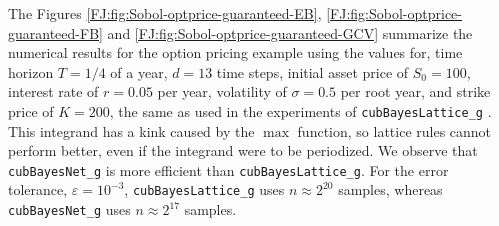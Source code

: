 \documentclass[graybox,footinfo]{svmult}
\begin{document}
The Figures \ref{FJ:fig:Sobol-optprice-guaranteed-EB}, \ref{FJ:fig:Sobol-optprice-guaranteed-FB} and 
\ref{FJ:fig:Sobol-optprice-guaranteed-GCV} summarize the numerical results for the option pricing example using the values for,
time horizon $T = 1/4$ of a year, $d = 13$ time steps, initial asset price of $S_0 = 100$, interest rate of $r =  0.05$ per year, volatility of $\sigma = 0.5$ per root year, and strike price of  $K = 200$, the same as used in the experiments of \texttt{cubBayesLattice\_g} \cite{RatHic19a}.
This integrand has a kink caused by the $\max$ function, so lattice rules cannot perform better, even if the integrand were to be periodized.  We observe that \texttt{cubBayesNet\_g} is more efficient than \texttt{cubBayesLattice\_g}.  For the error tolerance, $\varepsilon=10^{-3}$,  \texttt{cubBayesLattice\_g} uses $n \approx 2^{20}$ samples, whereas \texttt{cubBayesNet\_g} uses $n \approx 2^{17}$ samples.
\end{document}
